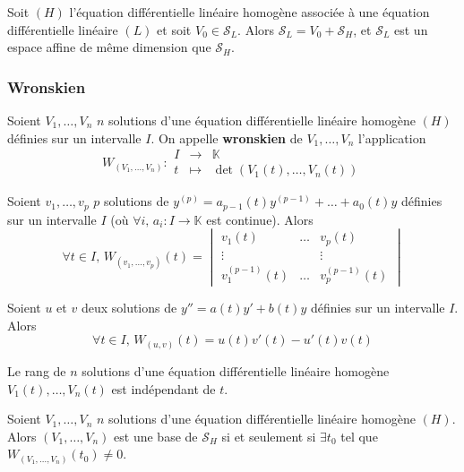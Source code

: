   \begin{corollary}
    Soit $(H)$ l'équation différentielle linéaire homogène associée à une équation différentielle linéaire $(L)$ et soit $V_0 \in \mathcal{S}_L$. Alors $\mathcal{S}_L = V_0 + \mathcal{S}_H$, et $\mathcal{S}_L$ est un espace affine de même dimension que $\mathcal{S}_H$.
  \end{corollary}

  \subsubsection{Wronskien}

  \begin{definition}
    Soient $V_1, \dots, V_n$ $n$ solutions d'une équation différentielle linéaire homogène $(H)$ définies sur un intervalle $I$. On appelle \textbf{wronskien} de $V_1, \dots, V_n$ l'application
    \[
    W_{(V_1, \dots, V_n)} :
    \begin{array}{ccc}
      I &\rightarrow& \mathbb{K} \\
      t &\mapsto& \det(V_1(t), \dots, V_n(t))
    \end{array}
    \]
  \end{definition}

  \begin{example}
    Soient $v_1, \dots, v_p$ $p$ solutions de $y^{(p)} = a_{p-1}(t)y^{(p-1)} + \dots + a_0(t) y$ définies sur un intervalle $I$ (où $\forall i, \, a_i : I \rightarrow \mathbb{K}$ est continue). Alors \[ \forall t \in I, \, W_{(v_1, \dots, v_p)}(t) = \begin{vmatrix} v_1(t) & \dots & v_p(t) \\ \vdots & & \vdots \\ v_1^{(p-1)}(t) & \dots & v_p^{(p-1)}(t) \end{vmatrix} \]
  \end{example}

  \begin{example}
    Soient $u$ et $v$ deux solutions de $y'' = a(t)y' + b(t)y$ définies sur un intervalle $I$. Alors \[ \forall t \in I, \, W_{(u, v)}(t) = u(t)v'(t) - u'(t)v(t) \]
  \end{example}

  \begin{proposition}
    Le rang de $n$ solutions d'une équation différentielle linéaire homogène $V_1(t), \dots, V_n(t)$ est indépendant de $t$.
  \end{proposition}

  \begin{corollary}
    Soient $V_1, \dots, V_n$ $n$ solutions d'une équation différentielle linéaire homogène $(H)$. Alors $(V_1, \dots, V_n)$ est une base de $\mathcal{S}_H$ si et seulement si $\exists t_0$ tel que $W_{(V_1, \dots, V_n)}(t_0) \neq 0$.
  \end{corollary}

